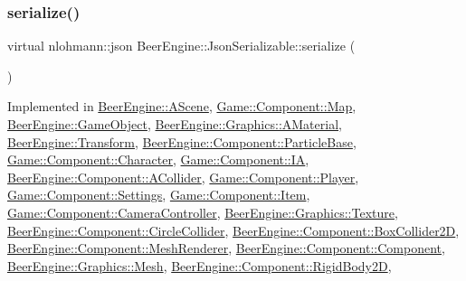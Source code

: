 \subsubsection{\texorpdfstring{serialize()}{serialize()}}
{\footnotesize\ttfamily virtual nlohmann\+::json Beer\+Engine\+::\+Json\+Serializable\+::serialize (\begin{DoxyParamCaption}{ }\end{DoxyParamCaption})\hspace{0.3cm}{\ttfamily [pure virtual]}}



Implemented in \mbox{\hyperlink{class_beer_engine_1_1_a_scene_ae876ec81592c80e7346f05c56bdaa929}{Beer\+Engine\+::\+A\+Scene}}, \mbox{\hyperlink{class_game_1_1_component_1_1_map_a220f971266cc2b3c5f7b6a10639ec8e6}{Game\+::\+Component\+::\+Map}}, \mbox{\hyperlink{class_beer_engine_1_1_game_object_a4b1436f051194c385b9a82ad8fbb0c5b}{Beer\+Engine\+::\+Game\+Object}}, \mbox{\hyperlink{class_beer_engine_1_1_graphics_1_1_a_material_aaf0626af4ae3a8e004dfd3f1a23bd7c4}{Beer\+Engine\+::\+Graphics\+::\+A\+Material}}, \mbox{\hyperlink{class_beer_engine_1_1_transform_aafa05f7ad8f420d5aa35671fd1f65d37}{Beer\+Engine\+::\+Transform}}, \mbox{\hyperlink{class_beer_engine_1_1_component_1_1_particle_base_ac4ab484a5ef468cbb69cccdf39e6d9a8}{Beer\+Engine\+::\+Component\+::\+Particle\+Base}}, \mbox{\hyperlink{class_game_1_1_component_1_1_character_a4f77e3bf02c40339350f47626d57dad8}{Game\+::\+Component\+::\+Character}}, \mbox{\hyperlink{class_game_1_1_component_1_1_i_a_a3d5af6c25e457a246fac8cbd63764223}{Game\+::\+Component\+::\+IA}}, \mbox{\hyperlink{class_beer_engine_1_1_component_1_1_a_collider_aecc5eb364d52beede07428ba1b668e09}{Beer\+Engine\+::\+Component\+::\+A\+Collider}}, \mbox{\hyperlink{class_game_1_1_component_1_1_player_a164f1424c0ff3d603ee60301e0aee6a7}{Game\+::\+Component\+::\+Player}}, \mbox{\hyperlink{class_game_1_1_component_1_1_settings_a1e378dbe2c0c7a198eae234e5979e91f}{Game\+::\+Component\+::\+Settings}}, \mbox{\hyperlink{class_game_1_1_component_1_1_item_a8aae88fd10b852e81fbaa16b5912a4ab}{Game\+::\+Component\+::\+Item}}, \mbox{\hyperlink{class_game_1_1_component_1_1_camera_controller_a1a7f36bf3f1f25b0edd404146f0c3289}{Game\+::\+Component\+::\+Camera\+Controller}}, \mbox{\hyperlink{class_beer_engine_1_1_graphics_1_1_texture_acb81c7ded6c7be42b0e901dd57dc8785}{Beer\+Engine\+::\+Graphics\+::\+Texture}}, \mbox{\hyperlink{class_beer_engine_1_1_component_1_1_circle_collider_a9898927635bb575aa2895cc5516433fc}{Beer\+Engine\+::\+Component\+::\+Circle\+Collider}}, \mbox{\hyperlink{class_beer_engine_1_1_component_1_1_box_collider2_d_a9172319becb9c609206265378ad04724}{Beer\+Engine\+::\+Component\+::\+Box\+Collider2D}}, \mbox{\hyperlink{class_beer_engine_1_1_component_1_1_mesh_renderer_a65c6c22ae40b5b94f590c3a8bf14d0d0}{Beer\+Engine\+::\+Component\+::\+Mesh\+Renderer}}, \mbox{\hyperlink{class_beer_engine_1_1_component_1_1_component_a4d82d8a6b22b93514e0585fa4073041f}{Beer\+Engine\+::\+Component\+::\+Component}}, \mbox{\hyperlink{class_beer_engine_1_1_graphics_1_1_mesh_a2bdd2912e84c9e2d686bdad2dbf6ec9e}{Beer\+Engine\+::\+Graphics\+::\+Mesh}}, \mbox{\hyperlink{class_beer_engine_1_1_component_1_1_rigid_body2_d_afd6b6d4073e564a1c536243027bb8597}{Beer\+Engine\+::\+Component\+::\+Rigid\+Body2D}}, 